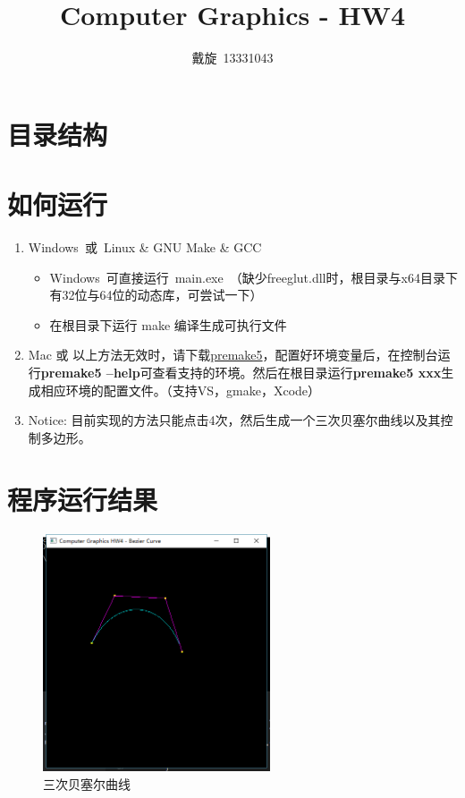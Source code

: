 \documentclass[hyperref, UTF8]{ctexart}
\title{Computer Graphics - HW4}
\author{戴旋\ 13331043}
\begin{document}
	\maketitle
	\tableofcontents

	\section{目录结构}


	\section{如何运行}
	\begin{enumerate}
		\item Windows\ 或\ Linux \& GNU Make \& GCC
		\begin{itemize}
			\item Windows\ 可直接运行\ main.exe\ （缺少freeglut.dll时，根目录与x64目录下有32位与64位的动态库，可尝试一下）
			\item 在根目录下运行 make 编译生成可执行文件
		\end{itemize}
		\item Mac 或 以上方法无效时，请下载\href{http://premake.github.io/index.html}{premake5}，配置好环境变量后，在控制台运行\textbf{premake5 --help}可查看支持的环境。然后在根目录运行\textbf{premake5 xxx}生成相应环境的配置文件。（支持VS，gmake，Xcode）
    \item Notice: 目前实现的方法只能点击4次，然后生成一个三次贝塞尔曲线以及其控制多边形。
	\end{enumerate}
	
	\section{程序运行结果}
	\begin{figure}[H]
		\centering
		\includegraphics[width=0.6\textwidth]{../results/3-bezier.png}
		\caption{三次贝塞尔曲线}
	\end{figure}
\end{document}
